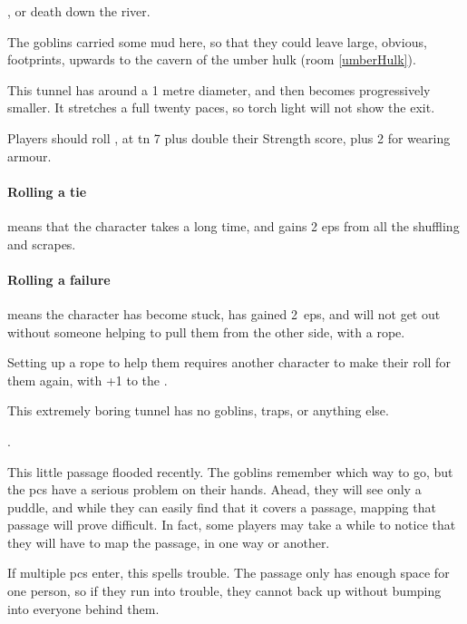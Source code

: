\begin{multicols}{2}
, or death down the river.



The goblins carried some mud here, so that they could leave large, obvious, footprints, upwards to the cavern of the umber hulk (room \ref{umberHulk}).


This tunnel has around a 1 metre diameter, and then becomes progressively smaller.
It stretches a full twenty paces, so torch light will not show the exit.

Players should roll , at \gls{tn} 7 plus double their Strength score, plus 2 for wearing armour.

\paragraph{Rolling a tie}
means that the character takes a long time, and gains 2 \glspl{ep} from all the shuffling and scrapes.

\paragraph{Rolling a failure}
means the character has become stuck, has gained 2~\glspl{ep}, and will not get out without someone helping to pull them from the other side, with a rope.

Setting up a rope to help them requires another character to make their roll for them again, with +1 to the .


This extremely boring tunnel has no goblins, traps, or anything else.

.


This little passage flooded recently.
The goblins remember which way to go, but the \glspl{pc} have a serious problem on their hands.
Ahead, they will see only a puddle, and while they can easily find that it covers a passage, mapping that passage will prove difficult.
In fact, some players may take a while to notice that they will have to map the passage, in one way or another.

If multiple \glspl{pc} enter, this spells trouble.
The passage only has enough space for one person, so if they run into trouble, they cannot back up without bumping into everyone behind them.


\end{multicols}
